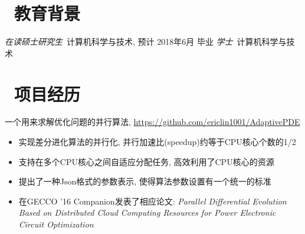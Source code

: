 \documentclass{resume}
\newcommand\quelle[1]{{%
		\unskip\nobreak\hfil\penalty50
		\hskip2em\hbox{}\nobreak\hfil #1%
\parfillskip=0pt \finalhyphendemerits=0 \par}}
\begin{document}


\basicInfo{
	\email{ericlin1001@qq.com} \textperiodcentered\ 
	\phone{(+86) 135-8053-2764} 
}

\section{\faGraduationCap\ 教育背景}
\textit{在读硕士研究生}\  计算机科学与技术, 预计 2018年6月 毕业
\textit{学士}\ 计算机科学与技术 


\section{\faUsers\ 项目经历}

一个用来求解优化问题的并行算法, \url{https://github.com/ericlin1001/AdaptivePDE}

\begin{itemize}
	\item 实现差分进化算法的并行化, 并行加速比(speedup)约等于CPU核心个数的1/2
	\item 支持在多个CPU核心之间自适应分配任务, 高效利用了CPU核心的资源
	\item 提出了一种Json格式的参数表示, 使得算法参数设置有一个统一的标准
	\item 在GECCO '16 Companion发表了相应论文: \textit{Parallel Differential Evolution Based on Distributed Cloud Computing Resources for Power Electronic Circuit Optimization} %
\end{itemize}
\end{document}

